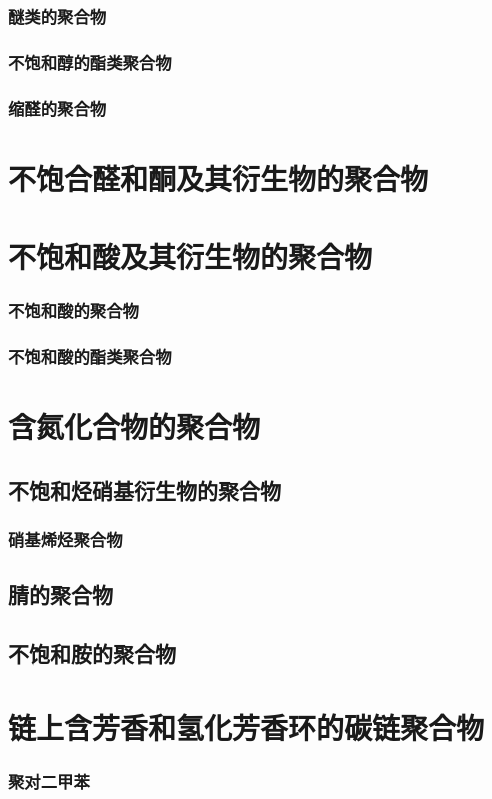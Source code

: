 \documentclass[UTF8]{../03-Chemistry}
\begin{document}
    \subsubsection{醚类的聚合物}
    \subsubsection{不饱和醇的酯类聚合物}
    \subsubsection{缩醛的聚合物}
\section{不饱合醛和酮及其衍生物的聚合物}
\section{不饱和酸及其衍生物的聚合物}
    \subsubsection{不饱和酸的聚合物}
    \subsubsection{不饱和酸的酯类聚合物}
\section{含氮化合物的聚合物}
    \subsection{不饱和烃硝基衍生物的聚合物}
        \subsubsection{硝基烯烃聚合物}
    \subsection{腈的聚合物}
    \subsection{不饱和胺的聚合物}
\section{链上含芳香和氢化芳香环的碳链聚合物}
    \subsubsection{聚对二甲苯}
\end{document}

